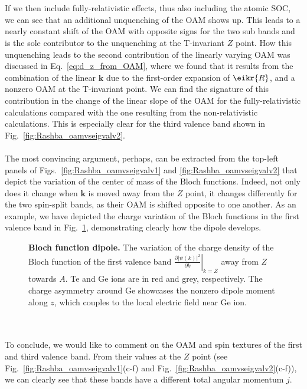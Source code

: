 \\\\
If we then include fully-relativistic effects, thus also including the atomic SOC, we can see that an additional unquenching of the OAM shows up.
This leads to a nearly constant shift of the OAM with opposite signs for the two sub bands and is the sole contributor to the unquenching at the T-invariant $Z$ point.
How this unquenching leads to the second contribution of the linearly varying OAM was discussed in Eq.~\eqref{eq:d_z_from_OAM}, where we found that it results from the combination of the linear $\bm k$ due to the first-order expansion of $\eikr{R}$, and a nonzero OAM at the T-invariant point.
We can find the signature of this contribution in the change of the linear slope of the OAM for the fully-relativistic calculations compared with the one resulting from the non-relativistic calculations.
This is especially clear for the third valence band shown in Fig.~\ref{fig:Rashba_oamvseigvalv2}.
\\\\
The most convincing argument, perhaps, can be extracted from the top-left panels of Figs.~\ref{fig:Rashba_oamvseigvalv1} and \ref{fig:Rashba_oamvseigvalv2} that depict the variation of the center of mass of the Bloch functions. Indeed, not only does it change when $\bm k$ is moved away from the $Z$ point, it changes differently for the two spin-split bands, as their OAM is shifted opposite to one another.
As an example,  we have depicted the charge variation of the Bloch functions in the first valence band in Fig.~\ref{fig:Rashba_diffdens}, demonstrating clearly how the dipole develops.
\begin{figure}
	\centering
{}
\caption{\label{fig:Rashba_diffdens}{\bf Bloch function dipole.} The variation of the charge density of the Bloch function of the first valence band $\left.\frac{\partial |\psi(k)|^2}{\partial k}\right\rvert_{k=Z}$ away from $Z$ towards $A$. Te and Ge ions are in red and grey, respectively. The charge asymmetry around Ge showcases the nonzero dipole moment along $z$, which couples to the local electric field near Ge ion.}
\end{figure}
\\\\
To conclude, we would like to comment on the OAM and spin textures of the first and third valence band.
From their values at the $Z$ point (see Fig.~\ref{fig:Rashba_oamvseigvalv1}(c-f) and Fig.~\ref{fig:Rashba_oamvseigvalv2}(c-f)), we can clearly see that these bands have a different total angular momentum $j$.

